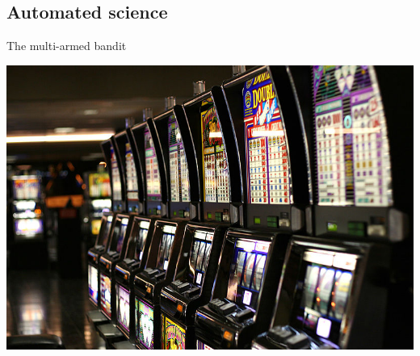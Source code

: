 \documentclass{beamer}
\newcommand{\pnote}[1] {}
\begin{document}
\subsection{Automated science}
\begin{frame}
  \centering
  \Huge{The multi-armed bandit}
\end{frame}
\begin{frame}
  \centering
  \includegraphics[width=\textwidth]{figures/Las_Vegas_slot_machines}
\end{frame}
\pnote{An example that typifies trial and error learning are bandit
problems. Imagine that you are in a Casino and you wish to
maximise the amount of money you make during the night. There are
a lot of machines to play. If you knew which one was the best,
then you'd just play it all night long. However, you must also
spend time trying out different machines, in order to get an
estimate of how much money each one gives out. The trade off
between trying out different machines and playing the one you
currently think is best is called the exploration-exploitation
trade-off and it appears in many problems of experiment design for
science.}
\end{document}
